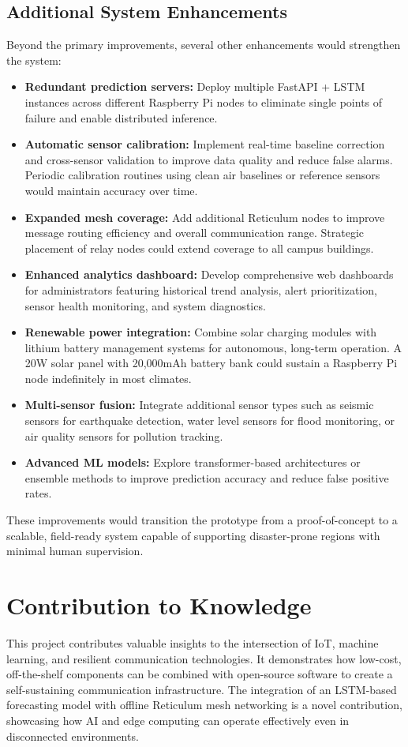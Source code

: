\subsection{Additional System Enhancements}
Beyond the primary improvements, several other enhancements would strengthen the system:
\begin{itemize}
    \item \textbf{Redundant prediction servers:} Deploy multiple FastAPI + LSTM instances across different Raspberry Pi nodes to eliminate single points of failure and enable distributed inference.
    \item \textbf{Automatic sensor calibration:} Implement real-time baseline correction and cross-sensor validation to improve data quality and reduce false alarms. Periodic calibration routines using clean air baselines or reference sensors would maintain accuracy over time.
    \item \textbf{Expanded mesh coverage:} Add additional Reticulum nodes to improve message routing efficiency and overall communication range. Strategic placement of relay nodes could extend coverage to all campus buildings.
    \item \textbf{Enhanced analytics dashboard:} Develop comprehensive web dashboards for administrators featuring historical trend analysis, alert prioritization, sensor health monitoring, and system diagnostics.
    \item \textbf{Renewable power integration:} Combine solar charging modules with lithium battery management systems for autonomous, long-term operation. A 20W solar panel with 20,000mAh battery bank could sustain a Raspberry Pi node indefinitely in most climates.
    \item \textbf{Multi-sensor fusion:} Integrate additional sensor types such as seismic sensors for earthquake detection, water level sensors for flood monitoring, or air quality sensors for pollution tracking.
    \item \textbf{Advanced ML models:} Explore transformer-based architectures or ensemble methods to improve prediction accuracy and reduce false positive rates.
\end{itemize}

These improvements would transition the prototype from a proof-of-concept to a scalable, field-ready system capable of supporting disaster-prone regions with minimal human supervision.

\section{Contribution to Knowledge}
This project contributes valuable insights to the intersection of IoT, machine learning, and resilient communication technologies. It demonstrates how low-cost, off-the-shelf components can be combined with open-source software to create a self-sustaining communication infrastructure. The integration of an LSTM-based forecasting model with offline Reticulum mesh networking is a novel contribution, showcasing how AI and edge computing can operate effectively even in disconnected environments.

